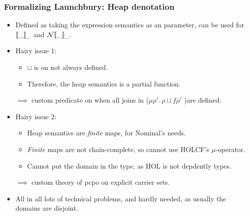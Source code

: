 \documentclass{beamer}
\begin{document}
\begin{frame}
\frametitle{Formalizing Launchbury: Heap denotation}

\begin{itemize}
\item Defined as taking the expression semantics as an parameter, can be used for $\llbracket \_ \rrbracket_{\_}$ and $\mathcal N\llbracket \_ \rrbracket_{\_}$.
\item Hairy issue 1:
\begin{itemize}
\item $\sqcup$ is on  not always defined.
\item Therefore, the heap semantics is a partial function.
\end{itemize}
$\implies$ custom predicate on when all joins in ($\mu \rho'.\,\rho \sqcup f \rho'$ )are defined.
\item Hairy issue 2:
\begin{itemize}
\item Heap semantics are \emph{finite} maps, for Nominal's needs.
\item \emph{Finite} maps are not chain-complete, so cannot use HOLCF's $\mu$-operator.
\item Cannot put the domain in the type, as HOL is not depdently types.
\end{itemize}
$\implies$ custom theory of pcpo on explicit carrier sets.
\item All in all lots of technical problems, and hardly needed, as usually the domains are disjoint.
\end{itemize}
\end{frame}
\end{document}

